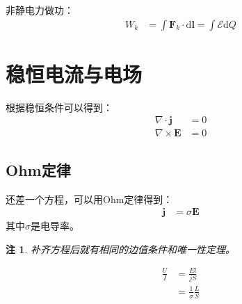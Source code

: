 \documentclass[12pt,onecolumn,a4paper]{book}
\newtheorem*{note}{注}
\numberwithin{table}{subsection}
\numberwithin{equation}{subsection}
\begin{document}
非静电力做功：
\begin{align}
    W_k & = \int \mathbf{F}_k \cdot \mathrm{d} \mathbf{l} = \int \mathcal{E} \mathrm{d} Q
\end{align}


\section{稳恒电流与电场}

根据稳恒条件可以得到：
\begin{align}
    \nabla \cdot \mathbf{j}  & = 0 \\
    \nabla \times \mathbf{E} & = 0
\end{align}

\subsection{Ohm定律}

还差一个方程，可以用Ohm定律得到：
\begin{align}
    \mathbf{j} & = \sigma \mathbf{E}
\end{align}
其中$\sigma$是电导率。

\begin{note}
    补齐方程后就有相同的边值条件和唯一性定理。
\end{note}

\begin{align}
    \frac{U}{I} & = \frac{El}{jS}                \\
                & = \frac{1}{\sigma} \frac{L}{S}
\end{align}
\end{document}
